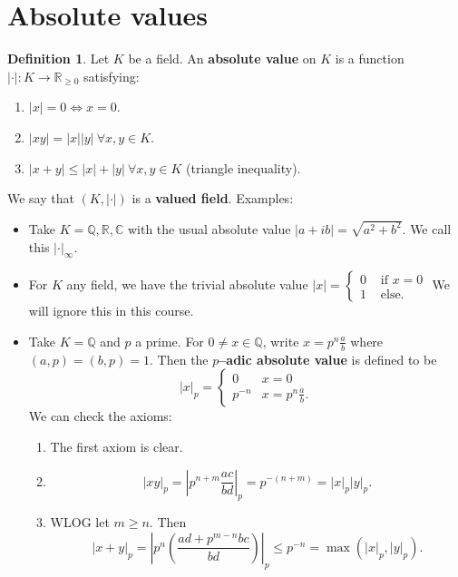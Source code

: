 \documentclass{article}
\theoremstyle{definition}
\newtheorem{defn}{Definition}[section]
\begin{document}
\section{Absolute values}
\begin{defn}
    Let $K$ be a field. An \textbf{absolute value} on $K$ is a function $|\cdot| : K \to \mathbb{R}_{\ge 0}$ satisfying:
    \begin{enumerate}[(1)]
        \item $|x| = 0 \iff x = 0$.
        \item $|xy| = |x||y| ~\forall x,y \in K$.
        \item $|x+y|\le |x|+|y| ~\forall x,y \in K$ (triangle inequality).
    \end{enumerate}
\end{defn}
We say that $(K, |\cdot|)$ is a \textbf{valued field}.
Examples:
\begin{itemize}
    \item Take $K=\mathbb{Q},\mathbb{R},\mathbb{C}$ with the usual absolute value $|a+ib| = \sqrt{a^2+b^2}$. We call this $|\cdot |_{\infty}$.
    \item For $K$ any field, we have the trivial absolute value $|x| = \begin{cases}
        0 & \text{ if } x = 0\\
        1 & \text{ else.}
    \end{cases}$
    We will ignore this in this course.
    \item Take $K= \mathbb{Q}$ and $p$ a prime. For $0 \neq x \in \mathbb{Q}$, write $x = p^n \frac{a}{b}$ where $(a,p)=(b,p)=1$. Then the \textbf{$p$--adic absolute value} is defined to be \[
    |x|_p = \begin{cases}
        0 & x=0\\
        p^{-n} & x = p^n\frac{a}{b}.
    \end{cases}
    \] 
    We can check the axioms:
    \begin{enumerate}[(1)]
        \item The first axiom is clear.
        \item $$|xy|_p = \left|p^{n+m}\frac{ac}{bd}\right|_p = p^{-(n+m)} = |x|_p|y|_p.$$
        \item WLOG let $m\ge n$. Then \[
        |x+y|_p = \left|p^n\left(\frac{ad+p^{m-n}bc}{bd}\right)\right|_p \le p^{-n} = \max(|x|_p, |y|_p).
        \]
    \end{enumerate}
\end{itemize}
\end{document}
